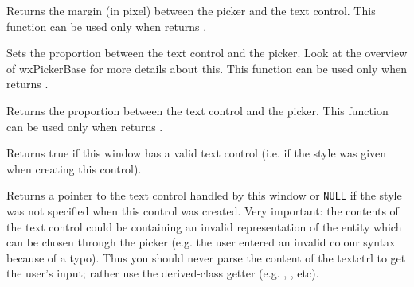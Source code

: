 \label{wxpickerbasegetinternalmargin}


Returns the margin (in pixel) between the picker and the text control.
This function can be used only when  returns \true.


\label{wxpickerbasesettextctrlproportion}


Sets the proportion between the text control and the picker.
Look at the overview of wxPickerBase for more details about this.
This function can be used only when  returns \true.


\label{wxpickerbasegettextctrlproportion}


Returns the proportion between the text control and the picker.
This function can be used only when  returns \true.



\label{wxpickerbasehastextctrl}


Returns true if this window has a valid text control (i.e. if the  style was
given when creating this control).


\label{wxpickerbasegetextctrl}


Returns a pointer to the text control handled by this window or \texttt{NULL} if the  style was not specified when this control was created.
Very important: the contents of the text control could be containing an invalid representation of the entity which can be chosen through the picker (e.g. the user entered an invalid colour syntax because of a typo). Thus you should never parse the content of the textctrl to get the user's input; rather use the derived-class getter (e.g. , , etc).


